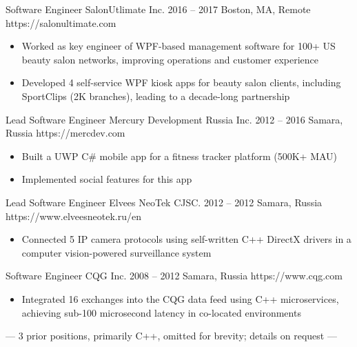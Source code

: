 \documentclass[9pt,a4paper]{juicv}
\begin{document}
\begin{paracol}{2}
    \cvLeftEvent
        {Software Engineer}
        {SalonUtlimate Inc.}
        {2016 -- 2017}
        {Boston, MA, Remote}
        {https://salonultimate.com}

        \begin{itemize}
            \item Worked as key engineer of WPF-based management software
                  for 100+ US beauty salon networks, improving operations and customer experience
            \item Developed 4 self-service WPF kiosk apps for beauty salon clients,
                  including SportClips (2K branches), leading to a decade-long partnership
        \end{itemize}

    \cvLeftEvent
        {Lead Software Engineer}
        {Mercury Development Russia Inc.}
        {2012 -- 2016}
        {Samara, Russia}
        {https://mercdev.com}

        \begin{itemize}
            \item Built a UWP C\# mobile app for a fitness tracker platform (500K+ MAU)
            \item Implemented social features for this app
        \end{itemize}

    \cvLeftEvent
        {Lead Software Engineer}
        {Elvees NeoTek CJSC.}
        {2012 -- 2012}
        {Samara, Russia}
        {https://www.elveesneotek.ru/en}

        \begin{itemize}
            \item Connected 5 IP camera protocols using self-written C++ DirectX drivers
                  in a computer vision-powered surveillance system
        \end{itemize}

    \cvLeftEvent
        {Software Engineer}
        {CQG Inc.}
        {2008 -- 2012}
        {Samara, Russia}
        {https://www.cqg.com}

        \begin{itemize}
            \item Integrated 16 exchanges into the CQG data feed using C++ microservices,
                  achieving sub-100 microsecond latency in co-located environments
        \end{itemize}

    \vspace{2pt}
    \centerline{%
        \footnotesize
        \color{secondaryTextColor}
        --- 3 prior positions, primarily C++, omitted for brevity; details on request ---
    }%


\end{paracol}
\end{document}
